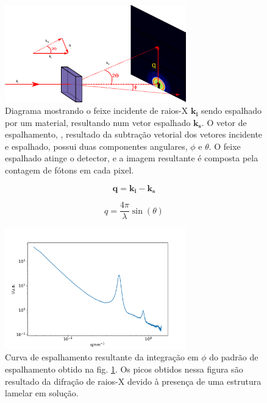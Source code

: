 		\begin{figure}[h]
			\centering
			\includegraphics[width=0.7\textwidth]{imagens/saxs/Esquema_SAXS}
			\caption{Diagrama mostrando o feixe incidente de raios-X \( \mathbf{k_i} \) sendo espalhado por um material, resultando num vetor espalhado \( \mathbf{k_s} \). O vetor de espalhamento, \q, resultado da subtração vetorial dos vetores incidente e espalhado, possui duas componentes angulares, \(\phi\) e \(\theta\). O feixe espalhado atinge o detector, e a imagem resultante é composta pela contagem de fótons em cada pixel.}
			\label{fig:esquema_saxs}
		\end{figure}

		\begin{equation}
			\mathbf{q} = \mathbf{k_i} - \mathbf{k_s}
			\label{eqn:vetor_espalhamento_vetorial}
		\end{equation}
		
		\begin{equation}
			q = \dfrac{4\pi}{\lambda} \sin(\theta)
			\label{eqn:vetor_espalhamento}
		\end{equation}
		
		\begin{figure}[h]
			\centering
			\includegraphics[width=0.7\textwidth]{imagens/saxs/exemplo_SAXS}
			\caption{Curva de espalhamento resultante da integração em \(\phi\) do padrão de espalhamento obtido na fig. \ref{fig:esquema_saxs}. Os picos obtidos nessa figura são resultado da difração de raios-X devido à presença de uma estrutura lamelar em solução.}
			\label{fig:exemplo_saxs}
		\end{figure}

